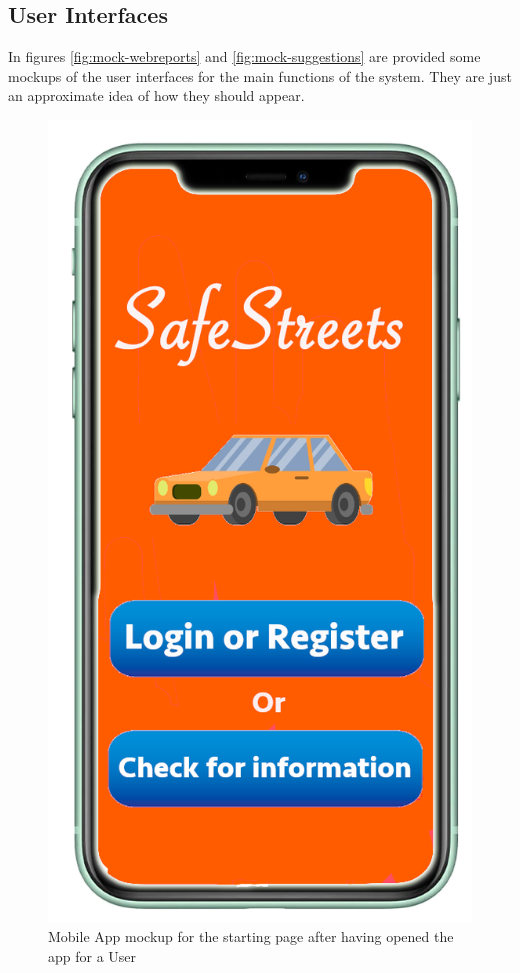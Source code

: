 \documentclass[a4paper]{report}
\begin{document}
\subsection{User Interfaces}
In figures \ref{fig:mock-webreports} and \ref{fig:mock-suggestions} are provided some mockups of the user interfaces for the main functions of the system. They are just an approximate idea of how they should appear.
\begin{figure}
\begin{minipage}{.45\textwidth}
\centering
\includegraphics[width=.7\linewidth]{mockups/phoneschermatainiziale.png}
\caption[Mobile App mockup for initial page]{Mobile App mockup for the starting page after having opened the app for a User}
\label{fig:initial-page}
\end{minipage}\hfill
\begin{minipage}{.45\textwidth}
\centering

\end{minipage}
\end{figure}
\end{document}
